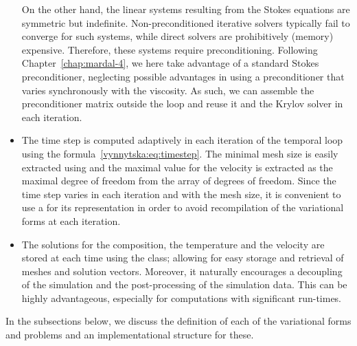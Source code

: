 \begin{itemize}
  On the other hand, the linear systems resulting from the Stokes
  equations are symmetric but indefinite. Non-preconditioned iterative
  solvers typically fail to converge for such systems, while direct
  solvers are prohibitively (memory) expensive. Therefore, these
  systems require preconditioning. Following
  Chapter~\ref{chap:mardal-4}, we here take advantage of a standard
  Stokes preconditioner, neglecting possible advantages in using a
  preconditioner that varies synchronously with the viscosity.  As
  such, we can assemble the preconditioner matrix outside the loop and
  reuse it and the Krylov solver in each iteration.
\item
  The time step  is computed adaptively in each iteration of
  the temporal loop using the
  formula~\eqref{vynnytska:eq:timestep}. The minimal mesh size is
  easily extracted using  and the maximal value for
  the velocity is extracted as the maximal degree of freedom from
  the  array of degrees of freedom. Since the time step
  varies in each iteration and with the mesh size, it is convenient to
  use a  for its representation in order to avoid
  recompilation of the variational forms at each iteration.
\item
  The solutions for the composition, the temperature and the velocity
  are stored at each time using the  class; allowing
  for easy storage and retrieval of meshes and solution
  vectors. Moreover, it naturally encourages a decoupling of the
  simulation and the post-processing of the simulation data. This can
  be highly advantageous, especially for computations with significant
  run-times.
\end{itemize}
In the subsections below, we discuss the definition of each of the
variational forms and problems and an implementational structure for
these.

